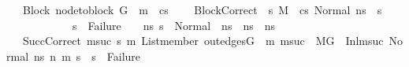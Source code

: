 \begin{isabellebody}
\ \ \ Block{\isacharcolon}{\kern0pt}\ {\isachardoublequoteopen}node{\isacharunderscore}{\kern0pt}to{\isacharunderscore}{\kern0pt}block\ G\ {\isacharbang}{\kern0pt}\ m\ {\isacharequal}{\kern0pt}\ cs{\isachardoublequoteclose}\ \isanewline
\ \ \ BlockCorrect{\isacharcolon}{\kern0pt}\ {\isachardoublequoteopen}{\isasymAnd}\ s{\isacharprime}{\kern0pt}{\isacharprime}{\kern0pt}{\isachardot}{\kern0pt}\ M{\isacharcomma}{\kern0pt}{\isasymLambda}{\isacharcomma}{\kern0pt}{\isasymGamma}{\isacharcomma}{\kern0pt}{\isasymOmega}\ {\isasymturnstile}\ {\isasymlangle}cs{\isacharcomma}{\kern0pt}\ Normal\ n{\isacharunderscore}{\kern0pt}s{\isasymrangle}\ {\isacharbrackleft}{\kern0pt}{\isasymrightarrow}{\isacharbrackright}{\kern0pt}\ s{\isacharprime}{\kern0pt}{\isacharprime}{\kern0pt}\ {\isasymLongrightarrow}\ \isanewline
\ \ \ \ \ \ \ \ \ \ \ \ s{\isacharprime}{\kern0pt}{\isacharprime}{\kern0pt}\ {\isasymnoteq}\ Failure\ {\isasymand}\ {\isacharparenleft}{\kern0pt}{\isasymforall}\ \ n{\isacharunderscore}{\kern0pt}s{\isacharprime}{\kern0pt}{\isachardot}{\kern0pt}\ {\isacharparenleft}{\kern0pt}{\isacharparenleft}{\kern0pt}s{\isacharprime}{\kern0pt}{\isacharprime}{\kern0pt}\ {\isacharequal}{\kern0pt}\ {\isacharparenleft}{\kern0pt}Normal\ \ n{\isacharunderscore}{\kern0pt}s{\isacharprime}{\kern0pt}{\isacharparenright}{\kern0pt}{\isacharparenright}{\kern0pt}\ {\isasymlongrightarrow}\ {\isacharparenleft}{\kern0pt}n{\isacharunderscore}{\kern0pt}s{\isacharprime}{\kern0pt}\ {\isacharequal}{\kern0pt}\ n{\isacharunderscore}{\kern0pt}s{\isacharparenright}{\kern0pt}{\isacharparenright}{\kern0pt}{\isacharparenright}{\kern0pt}{\isachardoublequoteclose}\ \isanewline
\ \ \ SuccCorrect{\isacharcolon}{\kern0pt}{\isachardoublequoteopen}{\isasymAnd}\ msuc\ s{}\ m{}{\isachardot}{\kern0pt}\ List{\isachardot}{\kern0pt}member\ {\isacharparenleft}{\kern0pt}out{\isacharunderscore}{\kern0pt}edges{\isacharparenleft}{\kern0pt}G{\isacharparenright}{\kern0pt}\ {\isacharbang}{\kern0pt}\ m{\isacharparenright}{\kern0pt}\ msuc\ {\isasymLongrightarrow}\ M{\isacharcomma}{\kern0pt}{\isasymLambda}{\isacharcomma}{\kern0pt}{\isasymGamma}{\isacharcomma}{\kern0pt}{\isasymOmega}{\isacharcomma}{\kern0pt}G\ {\isasymturnstile}\ {\isacharparenleft}{\kern0pt}Inl{\isacharparenleft}{\kern0pt}msuc{\isacharparenright}{\kern0pt}{\isacharcomma}{\kern0pt}\ Normal\ n{\isacharunderscore}{\kern0pt}s{\isacharparenright}{\kern0pt}\ {\isacharminus}{\kern0pt}n{\isasymrightarrow}{\isacharasterisk}{\kern0pt}\ {\isacharparenleft}{\kern0pt}m{}{\isacharcomma}{\kern0pt}\ s{}{\isacharparenright}{\kern0pt}\ {\isasymLongrightarrow}\ s{}\ {\isasymnoteq}\ Failure{\isachardoublequoteclose}\isanewline

\end{isabellebody}
